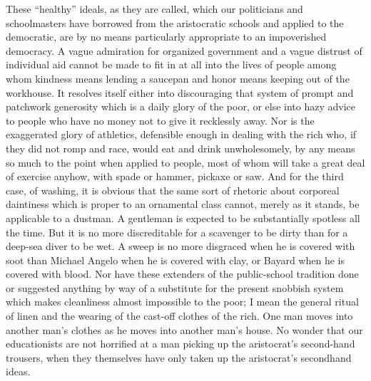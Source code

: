 \documentclass{book}
\begin{document}
These “healthy” ideals, as they are called, which our politicians and schoolmasters have borrowed from the aristocratic schools and applied to the democratic, are by no means particularly appropriate to an impoverished democracy. A vague admiration for organized government and a vague distrust of individual aid cannot be made to fit in at all into the lives of people among whom kindness means lending a saucepan and honor means keeping out of the workhouse. It resolves itself either into discouraging that system of prompt and patchwork generosity which is a daily glory of the poor, or else into hazy advice to people who have no money not to give it recklessly away. Nor is the exaggerated glory of athletics, defensible enough in dealing with the rich who, if they did not romp and race, would eat and drink unwholesomely, by any means so much to the point when applied to people, most of whom will take a great deal of exercise anyhow, with spade or hammer, pickaxe or saw. And for the third case, of washing, it is obvious that the same sort of rhetoric about corporeal daintiness which is proper to an ornamental class cannot, merely as it stands, be applicable to a dustman. A gentleman is expected to be substantially spotless all the time. But it is no more discreditable for a scavenger to be dirty than for a deep-sea diver to be wet. A sweep is no more disgraced when he is covered with soot than Michael Angelo when he is covered with clay, or Bayard when he is covered with blood. Nor have these extenders of the public-school tradition done or suggested anything by way of a substitute for the present snobbish system which makes cleanliness almost impossible to the poor; I mean the general ritual of linen and the wearing of the cast-off clothes of the rich. One man moves into another man’s clothes as he moves into another man’s house. No wonder that our educationists are not horrified at a man picking up the aristocrat’s second-hand trousers, when they themselves have only taken up the aristocrat’s secondhand ideas.
\end{document}
